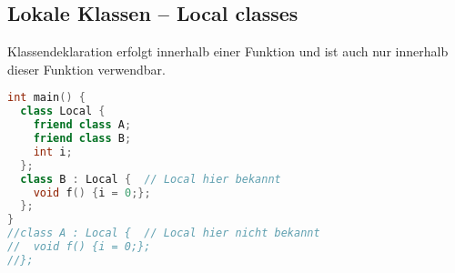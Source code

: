 \subsection{Lokale Klassen -- Local classes}

Klassendeklaration erfolgt innerhalb einer Funktion und ist auch nur innerhalb
dieser Funktion verwendbar.

\begin{lstlisting}[language=C++]
int main() {
  class Local {
    friend class A;
    friend class B;
    int i;
  };
  class B : Local {  // Local hier bekannt
    void f() {i = 0;};
  };
}
//class A : Local {  // Local hier nicht bekannt
//  void f() {i = 0;};
//};
\end{lstlisting}